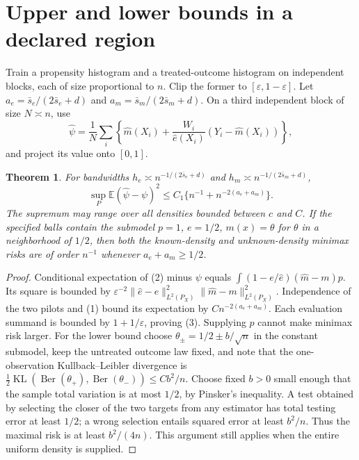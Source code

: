 \documentclass[11pt]{article}
\newtheorem{theorem}{Theorem}
\theoremstyle{definition}
\begin{document}
\section*{Upper and lower bounds in a declared region}
Train a propensity histogram and a treated-outcome histogram on independent
blocks, each of size proportional to $n$. Clip the former to
$[\varepsilon,1-\varepsilon]$. Let
$a_e=\bar s_e/(2\bar s_e+d)$ and $a_m=\bar s_m/(2\bar s_m+d)$.
On a third independent block of size $N\asymp n$, use
\[
 \widehat\psi=\frac1N\sum_i\left\{\widehat m(X_i)
       +\frac{W_i}{\widehat e(X_i)}(Y_i-\widehat m(X_i))\right\},       \tag{2}
\]
and project its value onto $[0,1]$.
\begin{theorem}
For bandwidths $h_e\asymp n^{-1/(2\bar s_e+d)}$ and
$h_m\asymp n^{-1/(2\bar s_m+d)}$,
\[
 \sup_P\mathbb E(\widehat\psi-\psi)^2
 \le C_1\{n^{-1}+n^{-2(a_e+a_m)}\}.                    \tag{3}
\]
The supremum may range over all densities bounded between $c$ and $C$.
If the specified balls contain the submodel $p=1$, $e=1/2$,
$m(x)=\theta$ for $\theta$ in a neighborhood of $1/2$, then both the
known-density and unknown-density minimax risks are of order $n^{-1}$
whenever $a_e+a_m\ge1/2$.
\end{theorem}
\begin{proof}
Conditional expectation of (2) minus $\psi$ equals
$\int(1-e/\widehat e)(\widehat m-m)p$.
Its square is bounded by
$\varepsilon^{-2}\|\widehat e-e\|_{L^2(P_X)}^2
\|\widehat m-m\|_{L^2(P_X)}^2$. Independence of the two pilots and (1)
bound its expectation by $C n^{-2(a_e+a_m)}$.
Each evaluation summand is bounded by $1+1/\varepsilon$, proving (3).
Supplying $p$ cannot make minimax risk larger.
For the lower bound choose $\theta_\pm=1/2\pm b/\sqrt n$ in the constant
submodel, keep the untreated outcome law fixed, and note that the
one-observation Kullback--Leibler divergence is
$\tfrac12\operatorname{KL}(\operatorname{Ber}(\theta_+),
\operatorname{Ber}(\theta_-))\le Cb^2/n$.
Choose fixed $b>0$ small enough that the sample total variation is at most
$1/2$, by Pinsker's inequality. A test obtained by selecting the closer of
the two targets from any estimator has total testing error at least $1/2$;
a wrong selection entails squared error at least $b^2/n$.
Thus the maximal risk is at least $b^2/(4n)$. This argument still applies
when the entire uniform density is supplied.
\end{proof}
\end{document}
